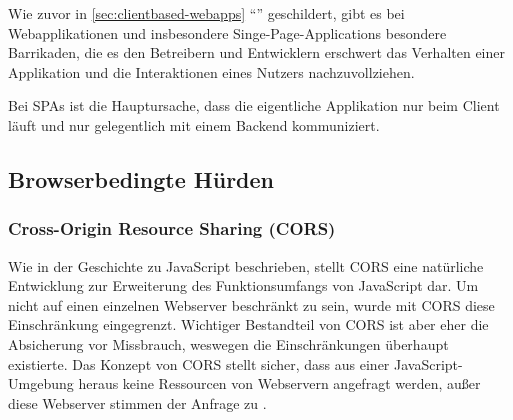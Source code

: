 Wie zuvor in \autoref{sec:clientbased-webapps} \enquote{} geschildert, gibt es bei Webapplikationen und insbesondere Singe-Page-Applications besondere Barrikaden, die es den Betreibern und Entwicklern erschwert das Verhalten einer Applikation und die Interaktionen eines Nutzers nachzuvollziehen.
	
Bei SPAs ist die Hauptursache, dass die eigentliche Applikation nur beim Client läuft und nur gelegentlich mit einem Backend kommuniziert.
	


\subsection{Browserbedingte Hürden}


\subsubsection{Cross-Origin Resource Sharing (CORS)}

Wie in der Geschichte zu JavaScript beschrieben, stellt CORS eine natürliche Entwicklung zur Erweiterung des Funktionsumfangs von JavaScript dar. Um nicht auf einen einzelnen Webserver beschränkt zu sein, wurde mit CORS diese Einschränkung eingegrenzt. Wichtiger Bestandteil von CORS ist aber eher die Absicherung vor Missbrauch, weswegen die Einschränkungen überhaupt existierte. Das Konzept von CORS stellt sicher, dass aus einer JavaScript-Umgebung heraus keine Ressourcen von Webservern angefragt werden, außer diese Webserver stimmen der Anfrage zu \cite{MDNCORS}.

